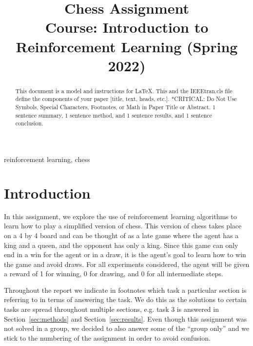 \documentclass[conference]{IEEEtran}
\begin{document}
\title{Chess Assignment\\
{\footnotesize Course: Introduction to Reinforcement Learning (Spring 2022)}
}

\author{
}

\maketitle

\begin{abstract}
    \color{red}
    This document is a model and instructions for \LaTeX.
    This and the IEEEtran.cls file define the components of your paper [title, text, heads, etc.]. *CRITICAL: Do Not Use Symbols, Special Characters, Footnotes, 
    or Math in Paper Title or Abstract.
    1 sentence summary, 1 sentence method, and 1 sentence results, and 1 sentence conclusion.
\end{abstract}

\begin{IEEEkeywords}
    \color{red}
    reinforcement learning, chess
\end{IEEEkeywords}






\section{Introduction}\label{sec:introduction}

In this assignment, we explore the use of reinforcement learning algorithms to learn how to play a simplified version of chess. This version of chess takes place on a 4 by 4 board and can be thought of as a late game where the agent has a king and a queen, and the opponent has only a king. Since this game can only end in a win for the agent or in a draw, it is the agent's goal to learn how to win the game and avoid draws. For all experiments considered, the agent will be given a reward of 1 for winning, 0 for drawing, and 0 for all intermediate steps.

Throughout the report we indicate in footnotes which task a particular section is referring to in terms of answering the task. We do this as the solutions to certain tasks are spread throughout multiple sections, e.g. task 3 is answered in Section~\ref{sec:methods} and Section~\ref{sec:results}. Even though this assignment was not solved in a group, we decided to also answer some of the ``group only'' and we stick to the numbering of the assignment in order to avoid confusion.
\end{document}
